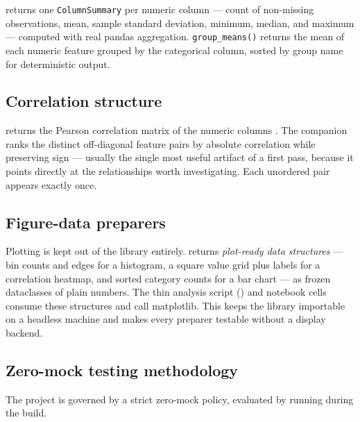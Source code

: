 \documentclass[
]{article}
\begin{document}
 returns one
\texttt{ColumnSummary} per numeric column --- count of non-missing
observations, mean, sample standard deviation, minimum, median, and
maximum --- computed with real pandas aggregation.
\texttt{group\_means()} returns the mean of each numeric feature grouped
by the categorical column, sorted by group name for deterministic
output.

\subsection{Correlation structure}\label{correlation-structure}

 returns the
Pearson correlation matrix of the numeric columns \citep{tukey1977eda}.
The companion  ranks the
distinct off-diagonal feature pairs by absolute correlation while
preserving sign --- usually the single most useful artifact of a first
pass, because it points directly at the relationships worth
investigating. Each unordered pair appears exactly once.

\subsection{Figure-data preparers}\label{figure-data-preparers}

Plotting is kept out of the library entirely.
 returns \emph{plot-ready data structures}
--- bin counts and edges for a histogram, a square value grid plus
labels for a correlation heatmap, and sorted category counts for a bar
chart --- as frozen dataclasses of plain numbers. The thin analysis
script () and notebook cells consume
these structures and call matplotlib. This keeps the library importable
on a headless machine and makes every preparer testable without a
display backend.

\subsection{Zero-mock testing
methodology}\label{zero-mock-testing-methodology}

The project is governed by a strict zero-mock policy, evaluated by
running
during the build.
\end{document}
